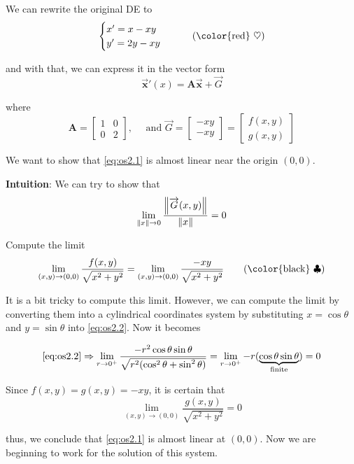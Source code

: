 \begin{solution}
    We can rewrite the original DE to
    \begin{equation*}
        \begin{cases}
            x' = x-xy\\
            y' = 2y-xy
        \end{cases} \label{eq:os2.1} \tag{{\color{red} $\heartsuit  $}}
    \end{equation*}

    and with that, we can express it in the vector form
    \[
        \overrightarrow{\mathbf{x}}'(x) = \mathbf{A}\overrightarrow{\mathbf{x}} + \overrightarrow{G}
    \]
    
    where
    \[
        \mathbf{A} = \begin{bmatrix}
            1 & 0\\ 0 & 2
        \end{bmatrix}, \quad \text{ and }
        \overrightarrow{G} = \begin{bmatrix}
            -xy \\ -xy 
        \end{bmatrix}
        = \begin{bmatrix}
            f(x,y) \\ g(x,y)
        \end{bmatrix}
    \]

    We want to show that \eqref{eq:os2.1} is almost linear near the origin $(0,0)$.
    
    \textbf{Intuition}: We can try to show that
    \begin{equation*}
        \lim_{\left\lVert x\right\rVert \to 0} \frac{\left\lVert\overrightarrow{G}(x,y)\right\rVert}{\left\lVert x\right\rVert} = 0
    \end{equation*}

    Compute the limit
    \begin{equation*}
        \lim_{(x,y) \to (0, 0)} \frac{f(x,y)}{\sqrt{x^2 + y^2}} = \lim_{(x,y) \to (0, 0)} \frac{-xy}{\sqrt{x^2 + y^2}} 
        \label{eq:os2.2} \tag{{\color{black} $\clubsuit$}}
    \end{equation*}

    It is a bit tricky to compute this limit. However, we can compute the limit by converting them into a cylindrical coordinates system 
    by substituting $x = \cos \theta$ and $y = \sin \theta$ into \eqref{eq:os2.2}. Now it becomes

    \begin{equation*}
        \eqref{eq:os2.2} \Rightarrow \lim_{r \to 0^+} \frac{-r^2 \cos \theta \sin \theta}{\sqrt{r^2(\cos^2 \theta + \sin^2 \theta)}} = \lim_{r \to 0^+} -r(\underbrace{\cos \theta \sin \theta}_\text{finite}) = 0
    \end{equation*}

    Since $f(x,y) = g(x,y) = -xy$, it is certain that 
    \begin{equation*}
        \lim_{(x,y) \to (0, 0)} \frac{g(x,y)}{\sqrt{x^2 + y^2}} = 0
    \end{equation*}

    thus, we conclude that \eqref{eq:os2.1} is almost linear at $(0,0)$. Now we are beginning to work for the 
    solution of this system.
\end{solution}